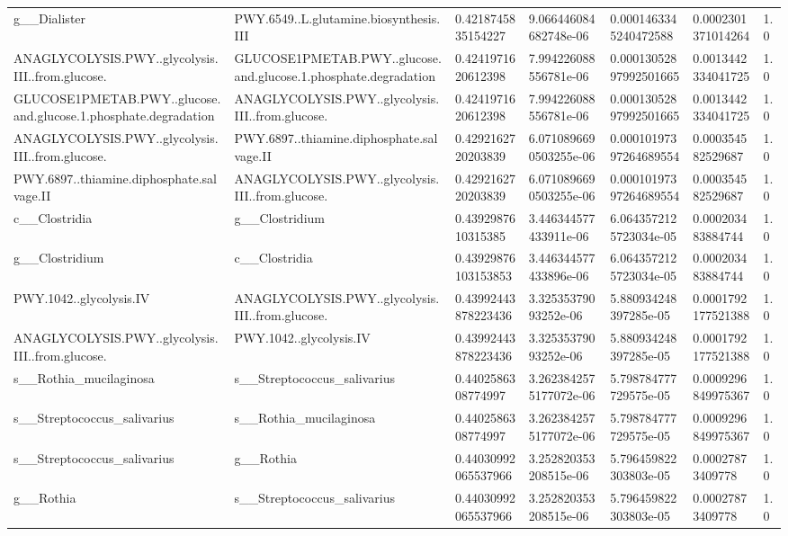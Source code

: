 \begin{longtable}{lllllll}
g\_\_Dialister & PWY.6549..L.glutamine.biosynthesis.III & 0.4218745835154227 & 9.066446084682748e-06 & 0.0001463345240472588 & 0.0002301371014264 & 1.0 \\
ANAGLYCOLYSIS.PWY..glycolysis.III..from.glucose. & GLUCOSE1PMETAB.PWY..glucose.and.glucose.1.phosphate.degradation & 0.4241971620612398 & 7.994226088556781e-06 & 0.00013052897992501665 & 0.0013442334041725 & 1.0 \\
GLUCOSE1PMETAB.PWY..glucose.and.glucose.1.phosphate.degradation & ANAGLYCOLYSIS.PWY..glycolysis.III..from.glucose. & 0.4241971620612398 & 7.994226088556781e-06 & 0.00013052897992501665 & 0.0013442334041725 & 1.0 \\
ANAGLYCOLYSIS.PWY..glycolysis.III..from.glucose. & PWY.6897..thiamine.diphosphate.salvage.II & 0.4292162720203839 & 6.0710896690503255e-06 & 0.00010197397264689554 & 0.000354582529687 & 1.0 \\
PWY.6897..thiamine.diphosphate.salvage.II & ANAGLYCOLYSIS.PWY..glycolysis.III..from.glucose. & 0.4292162720203839 & 6.0710896690503255e-06 & 0.00010197397264689554 & 0.000354582529687 & 1.0 \\
c\_\_Clostridia & g\_\_Clostridium & 0.4392987610315385 & 3.446344577433911e-06 & 6.0643572125723034e-05 & 0.000203483884744 & 1.0 \\
g\_\_Clostridium & c\_\_Clostridia & 0.43929876103153853 & 3.446344577433896e-06 & 6.0643572125723034e-05 & 0.000203483884744 & 1.0 \\
PWY.1042..glycolysis.IV & ANAGLYCOLYSIS.PWY..glycolysis.III..from.glucose. & 0.43992443878223436 & 3.32535379093252e-06 & 5.880934248397285e-05 & 0.0001792177521388 & 1.0 \\
ANAGLYCOLYSIS.PWY..glycolysis.III..from.glucose. & PWY.1042..glycolysis.IV & 0.43992443878223436 & 3.32535379093252e-06 & 5.880934248397285e-05 & 0.0001792177521388 & 1.0 \\
s\_\_Rothia\_mucilaginosa & s\_\_Streptococcus\_salivarius & 0.4402586308774997 & 3.2623842575177072e-06 & 5.798784777729575e-05 & 0.0009296849975367 & 1.0 \\
s\_\_Streptococcus\_salivarius & s\_\_Rothia\_mucilaginosa & 0.4402586308774997 & 3.2623842575177072e-06 & 5.798784777729575e-05 & 0.0009296849975367 & 1.0 \\
s\_\_Streptococcus\_salivarius & g\_\_Rothia & 0.44030992065537966 & 3.252820353208515e-06 & 5.796459822303803e-05 & 0.00027873409778 & 1.0 \\
g\_\_Rothia & s\_\_Streptococcus\_salivarius & 0.44030992065537966 & 3.252820353208515e-06 & 5.796459822303803e-05 & 0.00027873409778 & 1.0 \\

\end{longtable}
